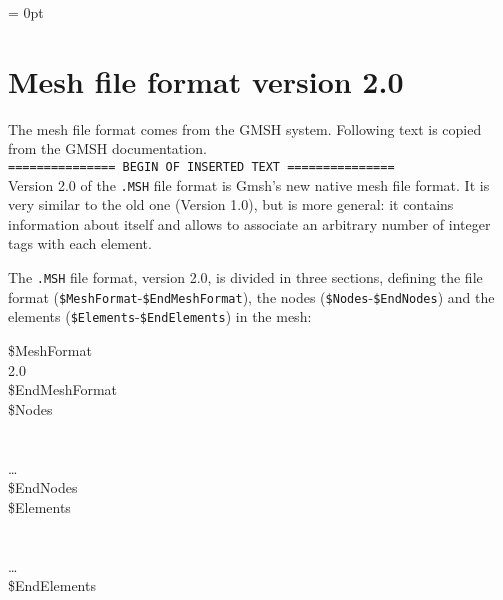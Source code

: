 %
%
%
%

\parindent = 0pt

\section*{Mesh file format version 2.0}
The mesh file format comes from the GMSH system. 
Following text is copied from the GMSH documentation.\\[0.5em]

{\tt =============== BEGIN OF INSERTED TEXT ===============}\\[0.3em]

Version 2.0 of the {\tt .MSH} file format is Gmsh's new native mesh file
format. It is very similar to the old one (Version 1.0), but is more
general: it contains information about itself and allows to associate an
arbitrary number of integer tags with each element.

The {\tt .MSH} file format, version 2.0, is divided in three sections,
defining the file format ({\tt \$MeshFormat}-{\tt \$EndMeshFormat}), the
nodes ({\tt \$Nodes}-{\tt \$EndNodes}) and the elements
({\tt \$Elements}-{\tt \$EndElements}) in the mesh:

\begin{fileformat}
\$MeshFormat\\
2.0  \\
\$EndMeshFormat\\
\$Nodes\\
\\
   \\
\dots\\
\$EndNodes\\
\$Elements\\
\\
    \\
\dots\\
\$EndElements
\end{fileformat}

